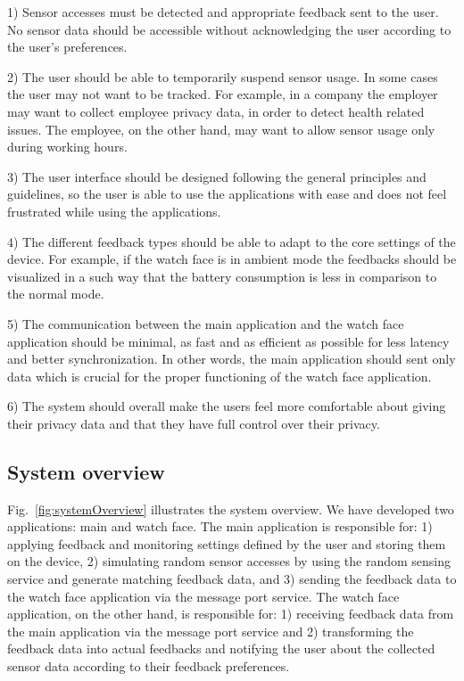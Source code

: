 \documentclass[conference, a4paper, 10pt, twocolumn]{IEEEtran}
\begin{document}
1) Sensor accesses must be detected and appropriate feedback sent to the user. No sensor data should be accessible without acknowledging the user according to the user's preferences. 

2) The user should be able to temporarily suspend sensor usage. In some cases the user may not want to be tracked. For example, in a company the employer may want to collect employee privacy data, in order to detect health related issues. The employee, on the other hand, may want to allow sensor usage only during working hours. 

3) The user interface should be designed following the general principles and guidelines, so the user is able to use the applications with ease and does not feel frustrated while using the applications. 

4) The different feedback types should be able to adapt to the core settings of the device. For example, if the watch face is in ambient mode the feedbacks should be visualized in a such way that the battery consumption is less in comparison to the normal mode. 

5) The communication between the main application and the watch face application should be minimal, as fast and as efficient as possible for less latency and better synchronization. In other words, the main application should sent only data which is crucial for the proper functioning of the watch face application. 

6) The system should overall make the users feel more comfortable about giving their privacy data and that they have full control over their privacy.   

\subsection{\textbf{System overview}}

Fig.~\ref{fig:systemOverview} illustrates the system overview. We have developed two applications: main and watch face. The main application is responsible for: 1) applying feedback and monitoring settings defined by the user and storing them on the device, 2) simulating random sensor accesses by using the random sensing service and generate matching feedback data, and 3) sending the feedback data to the watch face application via the message port service. The watch face application, on the other hand, is responsible for: 1) receiving feedback data from the main application via the message port service and 2) transforming the feedback data into actual feedbacks and notifying the user about the collected sensor data according to their feedback preferences.
\end{document}
